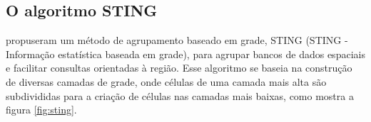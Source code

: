 \begin{figure}[!ht]
	\centering
\end{figure}

\subsection{O algoritmo STING}
 propuseram um método de agrupamento baseado em grade, \acrshort{STING} (\acrlong{STING} - Informação estatística baseada em grade), para agrupar bancos de dados espaciais e facilitar consultas orientadas à região. Esse algoritmo se baseia na construção de diversas camadas de grade, onde células de uma camada mais alta são subdivididas para a criação de células nas camadas mais baixas, como mostra a figura \ref{fig:sting}.

\begin{figure}[!ht]
	\centering	
\end{figure}

